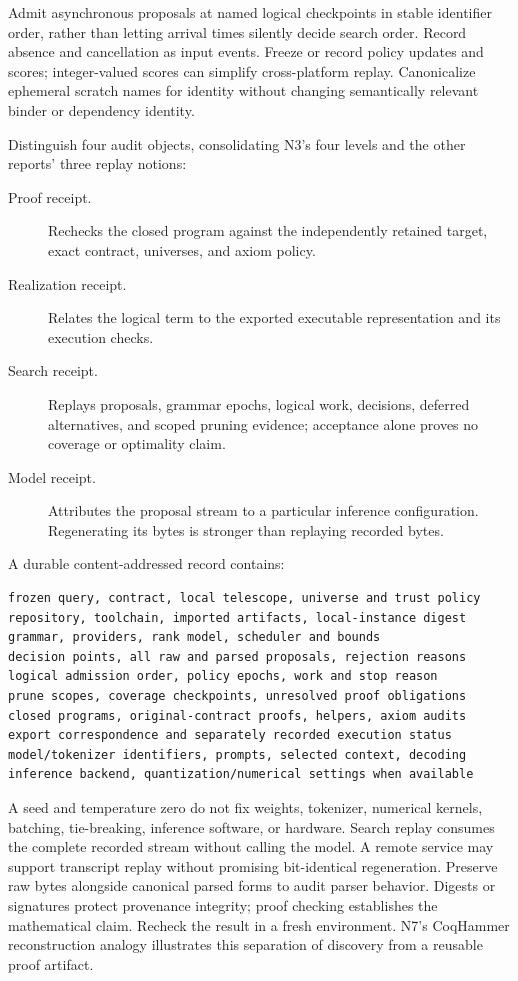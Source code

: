 Admit asynchronous proposals at named logical checkpoints in stable identifier order, rather than letting arrival times silently decide search order. Record absence and cancellation as input events. Freeze or record policy updates and scores; integer-valued scores can simplify cross-platform replay. Canonicalize ephemeral scratch names for identity without changing semantically relevant binder or dependency identity.

Distinguish four audit objects, consolidating N3's four levels and the other reports' three replay notions:
\begin{description}
\item[Proof receipt.] Rechecks the closed program against the independently retained target, exact contract, universes, and axiom policy.
\item[Realization receipt.] Relates the logical term to the exported executable representation and its execution checks.
\item[Search receipt.] Replays proposals, grammar epochs, logical work, decisions, deferred alternatives, and scoped pruning evidence; acceptance alone proves no coverage or optimality claim.
\item[Model receipt.] Attributes the proposal stream to a particular inference configuration. Regenerating its bytes is stronger than replaying recorded bytes.
\end{description}

A durable content-addressed record contains:
\begin{lstlisting}
frozen query, contract, local telescope, universe and trust policy
repository, toolchain, imported artifacts, local-instance digest
grammar, providers, rank model, scheduler and bounds
decision points, all raw and parsed proposals, rejection reasons
logical admission order, policy epochs, work and stop reason
prune scopes, coverage checkpoints, unresolved proof obligations
closed programs, original-contract proofs, helpers, axiom audits
export correspondence and separately recorded execution status
model/tokenizer identifiers, prompts, selected context, decoding
inference backend, quantization/numerical settings when available
\end{lstlisting}

A seed and temperature zero do not fix weights, tokenizer, numerical kernels, batching, tie-breaking, inference software, or hardware. Search replay consumes the complete recorded stream without calling the model. A remote service may support transcript replay without promising bit-identical regeneration. Preserve raw bytes alongside canonical parsed forms to audit parser behavior. Digests or signatures protect provenance integrity; proof checking establishes the mathematical claim. Recheck the result in a fresh environment. N7's CoqHammer reconstruction analogy illustrates this separation of discovery from a reusable proof artifact.

